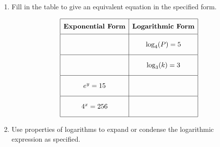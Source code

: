 \documentclass[11pt]{article}
\begin{document}
\begin{enumerate}

% 

\item %
\providecommand{\stxKnowl}{}\renewcommand{\stxKnowl}[1]{#1}
\providecommand{\stxOuttro}{}\renewcommand{\stxOuttro}[1]{#1}
\providecommand{\stxTitle}{}\renewcommand{\stxTitle}[1]{#1}
\renewcommand{\stxOuttro}[1]{}
\stxKnowl{
Fill in the table to give an equivalent equation in the specified form.

 \[\begin{array}{|c|c|} \hline \rule[-0.8em]{0pt}{2.2em} \textbf{Exponential Form} & \textbf{Logarithmic Form} \\ \hline \rule[-1.2em]{0pt}{3em} \hspace{3cm} & \log_{4}(P) = 5 \\ \hline \rule[-1.2em]{0pt}{3em} \hspace{3cm} & \log_{3}(k) = 3 \\ \hline \rule[-1.2em]{0pt}{3em} e^{y} = 15 & \hspace{3cm} \\ \hline \rule[-1.2em]{0pt}{3em} 4^{x} = 256 & \hspace{3cm} \\ \hline \end{array}\] 

\stxOuttro{
Solution

 \[\begin{array}{|c|c|} \hline \rule[-0.8em]{0pt}{2.2em} \textbf{Exponential Form} & \textbf{Logarithmic Form} \\ \hline \rule[-1.2em]{0pt}{3em} 4^{5} = P & \log_{4}(P) = 5 \\ \hline \rule[-1.2em]{0pt}{3em} k = 3^{3} & \log_{3}(k) = 3 \\ \hline \rule[-1.2em]{0pt}{3em} e^{y} = 15 & \ln(15) = y \\ \hline \rule[-1.2em]{0pt}{3em} 4^{x} = 256 & \log_{4}(256) = x \\ \hline \end{array}\] 

}
}

\newpage

% 

\item %
\providecommand{\stxKnowl}{}\renewcommand{\stxKnowl}[1]{#1}
\providecommand{\stxOuttro}{}\renewcommand{\stxOuttro}[1]{#1}
\providecommand{\stxTitle}{}\renewcommand{\stxTitle}[1]{#1}
\renewcommand{\stxOuttro}[1]{}
\stxKnowl{
Use properties of logarithms to expand or condense the logarithmic expression as specified.

}
\end{enumerate}
\end{document}
